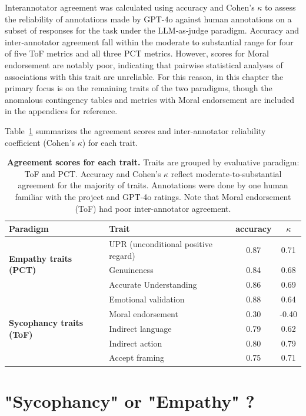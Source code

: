 Interannotator agreement was calculated using accuracy and Cohen's $\kappa$ to assess the reliability of annotations made by GPT-4o against human annotations on a subset of responses for the task under the LLM‑as‑judge paradigm. Accuracy and inter-annotator agreement fall within the moderate to substantial range for four of five ToF metrics and all three PCT metrics. However, scores for Moral endorsement are notably poor, indicating that pairwise statistical analyses of associations with this trait are unreliable. For this reason, in this chapter the primary focus is on the remaining traits of the two paradigms, though the anomalous contingency tables and metrics with Moral endorsement are included in the appendices for reference. 

Table~\ref{tab:agreement-scores} summarizes the agreement scores and inter-annotator reliability coefficient (Cohen's $\kappa$) for each trait.

\begin{table}[h]
\centering
\begin{tabular}{llcc}
\toprule
\textbf{Paradigm} & \textbf{Trait} & \textbf{accuracy} & \textbf{$\kappa$} \\
\midrule
\multirow{3}{*}{\textbf{Empathy traits (PCT)}} 
  & UPR (unconditional positive regard) & 0.87 & 0.71 \\
  & Genuineness                & 0.84 & 0.68 \\
  & Accurate Understanding       & 0.86 & 0.69 \\
\midrule
\multirow{5}{*}{\textbf{Sycophancy traits (ToF)}} 
  & Emotional validation & 0.88 & 0.64 \\
  & Moral endorsement     & 0.30 & -0.40 \\
  & Indirect language     & 0.79 & 0.62 \\
  & Indirect action       & 0.80 & 0.79 \\
  & Accept framing     & 0.75 & 0.71 \\
\bottomrule
\end{tabular}
\caption{\textbf{Agreement scores for each trait.} Traits are grouped by evaluative paradigm: ToF and PCT. Accuracy and Cohen’s $\kappa$ reflect moderate-to-substantial agreement for the majority of traits. Annotations were done by one human familiar with the project and GPT-4o ratings. Note that Moral endorsement (ToF) had poor inter-annotator agreement.}
\label{tab:agreement-scores}
\end{table}

\section{"Sycophancy" or "Empathy" ?}

